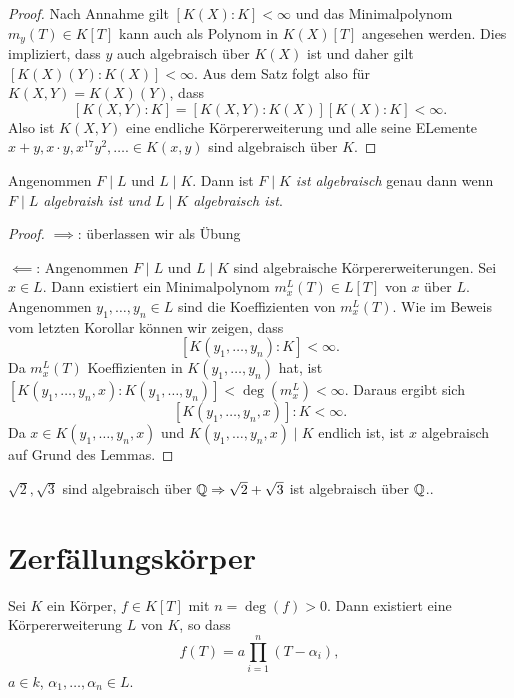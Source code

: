 \begin{proof}
	Nach Annahme gilt $[K(X) : K] < \infty$ und das Minimalpolynom $m_{y}(T) \in K[T]$ kann auch als
	Polynom in $K(X)[T]$ angesehen werden. Dies impliziert, dass $y$ auch algebraisch über $K(X)$ ist
	und daher gilt $[K(X)(Y) : K(X)] < \infty$. Aus dem Satz folgt also für $K(X,Y) = K(X)(Y)$, dass
	\[
		[K(X,Y):K] = [K(X,Y) : K(X)] [K(X) : K] < \infty
	.\] 
	Also ist $K(X,Y)$ eine endliche Körpererweiterung und alle seine ELemente
	$x+y, x\cdot y, x^{17} y^2, \ldots. \in K(x,y)$ sind algebraisch über $K$.
\end{proof}

\begin{corollary}
	Angenommen $F \mid L$ und $L \mid K$. Dann ist \emph{$F \mid K $ ist algebraisch} genau dann wenn  \emph{$F \mid L$ algebraish ist und $L \mid K$ algebraisch ist}.
\end{corollary}

\begin{proof}
	$\implies$: überlassen wir als Übung

	$\impliedby$: Angenommen $F \mid L$ und $L \mid K$ sind algebraische Körpererweiterungen. 
	Sei $x \in L$. Dann existiert ein Minimalpolynom $m_{x}^{L}(T) \in L[T]$ von $x$ über $L$.
	Angenommen $y_1,\ldots,y_{n} \in L$ sind die Koeffizienten von $m_{x}^{L}(T)$. Wie im Beweis vom letzten Korollar können wir zeigen, dass 
	\[
		[K(y_1,\ldots,y_{n}) : K] < \infty
	.\] 
	Da $m_{x}^{L}(T)$ Koeffizienten in $K(y_1,\ldots,y_{n})$ hat, ist $[K(y_1,\ldots,y_{n},x) : K(y_1,\ldots,y_{n})] < \deg(m_{x}^{L}) < \infty$.
	Daraus ergibt sich
	\[
		[K(y_1,\ldots,y_{n},x)] : K < \infty
	.\] 
	Da $x \in K(y_1,\ldots,y_{n},x)$ und $K(y_1,\ldots,y_{n},x) \mid K$ endlich ist, ist $x$ algebraisch auf Grund des Lemmas.
\end{proof}

\begin{eg}
	$\sqrt{2}, \sqrt{3}$ sind algebraisch über $\mathbb{Q} \Rightarrow \sqrt{2} + \sqrt{3}$ ist algebraisch über $\mathbb{Q}$..
\end{eg}

\section{Zerfällungskörper}

\begin{theorem}[Kronecker]
	Sei $K$ ein Körper, $f \in K[T]$ mit $n = \deg(f) > 0$. Dann existiert eine Körpererweiterung $L$ von $K$, so dass
	\[
		f(T) = a \prod_{i=1}^{n} (T-\alpha_{i}),
	\] 
	$a \in k$, $\alpha_1,\ldots,\alpha_{n} \in L$.
\end{theorem}

